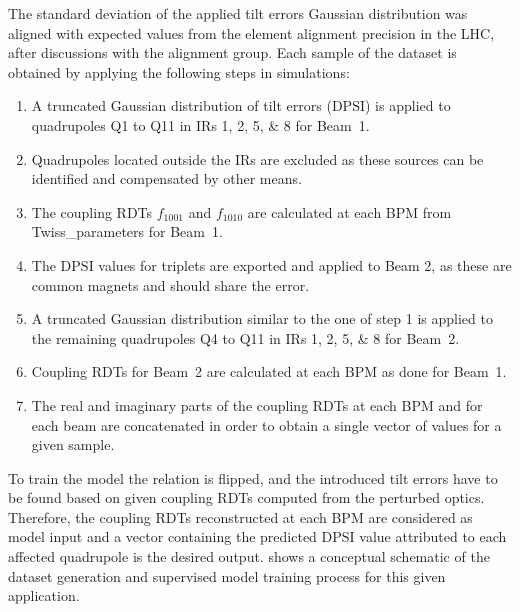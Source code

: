 The standard deviation of the applied tilt errors Gaussian distribution was aligned with expected values from the element alignment precision in the LHC, after discussions with the alignment group.
Each sample of the dataset is obtained by applying the following steps in simulations:
\begin{enumerate}
    \item A truncated Gaussian distribution of tilt errors (\(\mathrm{DPSI}\)) is applied to quadrupoles Q\num{1} to Q\num{11} in IRs \numlist{1;2;5;8} for Beam~\num{1}.
    \item Quadrupoles located outside the IRs are excluded as these sources can be identified and compensated by other means.
    \item The coupling RDTs \(f_{1001}\) and \(f_{1010}\) are calculated at each \acrshort{BPM} from \gls{Twiss_parameters} for Beam~\num{1}.
    \item The \(\mathrm{DPSI}\) values for triplets are exported and applied to Beam 2, as these are common magnets and should share the error.
    \item A truncated Gaussian distribution similar to the one of step \num{1} is applied to the remaining quadrupoles Q\num{4} to Q\num{11} in IRs \numlist{1;2;5;8} for Beam~\num{2}.
    \item Coupling RDTs for Beam~\num{2} are calculated at each BPM as done for Beam~\num{1}.
    \item The real and imaginary parts of the coupling RDTs at each BPM and for each beam are concatenated in order to obtain a single vector of values for a given sample.
\end{enumerate}

To train the model the relation is flipped, and the introduced tilt errors have to be found based on given coupling RDTs computed from the perturbed optics.
Therefore, the coupling RDTs reconstructed at each BPM are considered as model input and a vector containing the predicted \(\mathrm{DPSI}\) value attributed to each affected quadrupole is the desired output.
 shows a conceptual schematic of the dataset generation and supervised model training process for this given application.

